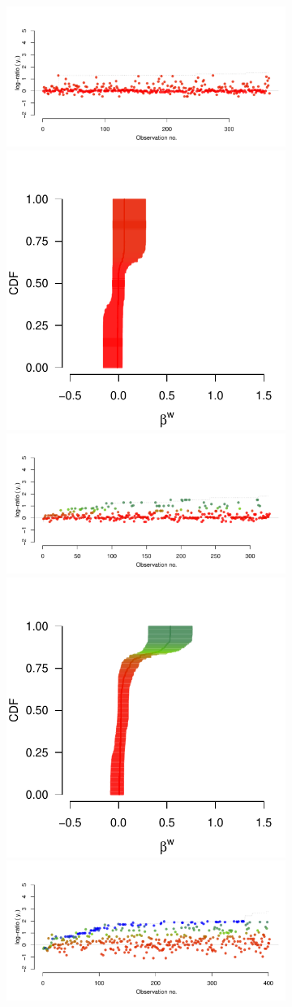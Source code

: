 \documentclass[9pt,a4paper,twocolumn,lineno]{article}
\begin{document}
\begin{figure}
	\begin{subfigure}{.44\linewidth}
		\includegraphics[width=.7\linewidth]{thread_max_55_1.pdf}
		\includegraphics[width=.28\linewidth]{beta_max_55_1.pdf}	
		\includegraphics[width=.7\linewidth]{thread_max_55_3.pdf}
		\includegraphics[width=.28\linewidth]{beta_max_55_3.pdf}
		\includegraphics[width=.7\linewidth]{thread_max_148_3.pdf}

\end{subfigure}
\end{figure}
\end{document}

